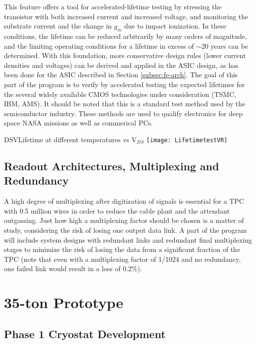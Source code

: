 This feature offers a tool for accelerated-lifetime testing by stressing the transistor with both increased current and increased voltage, and monitoring the substrate current and the change  in $g_{m}$ due to impact ionization. In these conditions, the lifetime can be reduced arbitrarily by many orders of magnitude, and the limiting operating conditions for a lifetime in excess of $\sim$20 years can be determined. With this foundation, more conservative design rules (lower current densities and voltages) can be derived and applied in the ASIC design, as has been done for the ASIC described in Section \ref{subsec:fe-arch}. The goal of this part of the program is to verify by accelerated testing the expected lifetimes for the several widely available CMOS technologies under consideration (TSMC, IBM, AMS). It should be noted that this is a standard test method used by the semiconductor industry. These methods are used to qualify electronics for deep space NASA missions as well as commerical PCs.
 
\begin{cdrfigure}{DSV}{Lifetime at different temperatures vs V$_{DS}$}
\texttt{[image: LifetimetestVR]}
\end{cdrfigure}

\subsection{Readout Architectures, Multiplexing and Redundancy}
A high degree of multiplexing after digitization of signals is essential for a TPC with 0.5 million wires in order to reduce the cable plant and the attendant outgassing. Just how high a multiplexing factor should be chosen is a matter of study, considering the risk of losing one output data link. A part of the
program will include system designs with redundant links and redundant final multiplexing stages to minimize the risk of losing the data from a significant fraction of the TPC (note that even with a multiplexing factor of 1/1024 and no redundancy, one failed link would result in a loss of 0.2\%).


\section{35-ton Prototype}

\subsection{Phase 1 Cryostat Development}
\label{35tonprototype}

